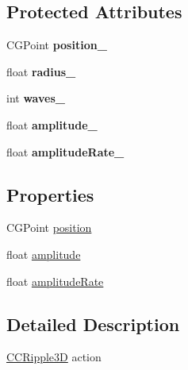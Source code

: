 \subsection*{Protected Attributes}
\begin{DoxyCompactItemize}
\item 
\hypertarget{interface_c_c_ripple3_d_abc10dfb9ef08bfda3a700c8ab1fd97c9}{C\-G\-Point {\bfseries position\-\_\-}}\label{interface_c_c_ripple3_d_abc10dfb9ef08bfda3a700c8ab1fd97c9}

\item 
\hypertarget{interface_c_c_ripple3_d_aa408e0849b76c3b00686b97fcfbae811}{float {\bfseries radius\-\_\-}}\label{interface_c_c_ripple3_d_aa408e0849b76c3b00686b97fcfbae811}

\item 
\hypertarget{interface_c_c_ripple3_d_a0df97fc4cb4d91168f706972baa3e5c8}{int {\bfseries waves\-\_\-}}\label{interface_c_c_ripple3_d_a0df97fc4cb4d91168f706972baa3e5c8}

\item 
\hypertarget{interface_c_c_ripple3_d_af114219ad7a36a04ac34c641aee08b9c}{float {\bfseries amplitude\-\_\-}}\label{interface_c_c_ripple3_d_af114219ad7a36a04ac34c641aee08b9c}

\item 
\hypertarget{interface_c_c_ripple3_d_aa4fabd410e1ac73ea43e25a066c0fdc1}{float {\bfseries amplitude\-Rate\-\_\-}}\label{interface_c_c_ripple3_d_aa4fabd410e1ac73ea43e25a066c0fdc1}

\end{DoxyCompactItemize}
\subsection*{Properties}
\begin{DoxyCompactItemize}
\item 
C\-G\-Point \hyperlink{interface_c_c_ripple3_d_afa4027c96980cd2b19d58714e951ea33}{position}
\item 
float \hyperlink{interface_c_c_ripple3_d_a54c3990c3e3f47813baa887b8aa3078a}{amplitude}
\item 
float \hyperlink{interface_c_c_ripple3_d_ae9ec53cba1ee0843189780a7840aa972}{amplitude\-Rate}
\end{DoxyCompactItemize}


\subsection{Detailed Description}
\hyperlink{interface_c_c_ripple3_d}{C\-C\-Ripple3\-D} action 

